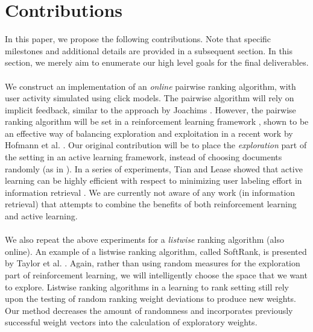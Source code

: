 \documentclass{acm_proc_article-sp}
\begin{document}
\section{Contributions}
In this paper, we propose the following contributions. Note that specific milestones and additional details are provided in a subsequent section. In this section, we merely aim to enumerate our high level goals for the final deliverables.\\ \\
We construct an implementation of an \emph{online} pairwise ranking algorithm, with user activity simulated using click models. The pairwise algorithm will rely on implicit feedback, similar to the approach by Joachims \cite{joachims}. However, the pairwise ranking algorithm will be set in a reinforcement learning framework \cite{rl}, shown to be an effective way of balancing exploration and exploitation in a recent work by Hofmann et al. \cite{hofmann}. Our original contribution will be to place the \emph{exploration} part of the setting in an active learning framework, instead of choosing documents randomly (as in \cite{hofmann}). In a series of experiments, Tian and Lease showed that active learning can be highly efficient with respect to minimizing user labeling effort in information retrieval \cite{aibo}. We are currently not aware of any work (in information retrieval) that attempts to combine the benefits of both reinforcement learning and active learning. \\ \\
We also repeat the above experiments for a \emph{listwise} ranking algorithm (also online). An example of a listwise ranking algorithm, called SoftRank, is presented by Taylor et al. \cite{taylor}. Again, rather than using random measures for the exploration part of reinforcement learning, we will intelligently choose the space that we want to explore.  Listwise ranking algorithms in a learning to rank setting still rely upon the testing of random ranking weight deviations to produce new weights.  Our method decreases the amount of randomness and incorporates previously successful weight vectors into the calculation of exploratory weights.\\ \\
\end{document}
